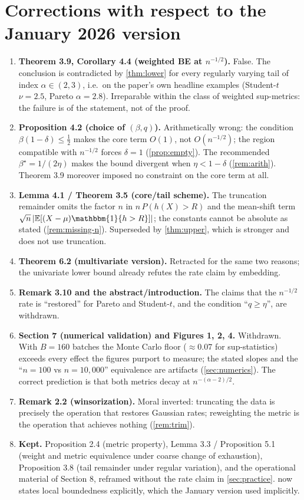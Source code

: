 \documentclass[11pt,a4paper]{article}
\theoremstyle{plain}
\theoremstyle{definition}
\theoremstyle{remark}
\numberwithin{equation}{section}
\newcommand{\E}{\mathbb{E}}
\newcommand{\1}{\mathbbm{1}}
\newcommand{\h}{h}
\begin{document}
\appendix

\section{Corrections with respect to the January 2026 version}\label{app:corrections}

\begin{enumerate}
\item \textbf{Theorem 3.9, Corollary 4.4 (weighted BE at $n^{-1/2}$).} False. The
conclusion is contradicted by \cref{thm:lower} for every regularly varying tail of
index $\alpha\in(2,3)$, i.e.\ on the paper's own headline examples (Student-$t$
$\nu=2.5$, Pareto $\alpha=2.8$). Irreparable within the class of weighted sup-metrics:
the failure is of the statement, not of the proof.
\item \textbf{Proposition 4.2 (choice of $(\beta,q)$).} Arithmetically wrong: the
condition $\beta(1-\delta)\le\frac12$ makes the core term $O(1)$, not $O(n^{-1/2})$;
the region compatible with $n^{-1/2}$ forces $\delta=1$ (\cref{prop:empty}). The
recommended $\beta^\star=1/(2\eta)$ makes the bound divergent when $\eta<1-\delta$
(\cref{rem:arith}). Theorem 3.9 moreover imposed no constraint on the core term at
all.
\item \textbf{Lemma 4.1 / Theorem 3.5 (core/tail scheme).} The truncation remainder
omits the factor $n$ in $n\,P(\h(X)>R)$ and the mean-shift term
$\sqrt n\,|\E[(X-\mu)\1\{\h>R\}]|$; the constants cannot be absolute as stated
(\cref{rem:missing-n}). Superseded by \cref{thm:upper}, which is stronger and does not
use truncation.
\item \textbf{Theorem 6.2 (multivariate version).} Retracted for the same two reasons;
the univariate lower bound already refutes the rate claim by embedding.
\item \textbf{Remark 3.10 and the abstract/introduction.} The claims that the
$n^{-1/2}$ rate is ``restored'' for Pareto and Student-$t$, and the condition
``$q\ge\eta$'', are withdrawn.
\item \textbf{Section 7 (numerical validation) and Figures 1, 2, 4.} Withdrawn. With
$B=160$ batches the Monte Carlo floor ($\approx0.07$ for sup-statistics) exceeds every
effect the figures purport to measure; the stated slopes and the ``$n=100$ vs
$n=10{,}000$'' equivalence are artifacts (\cref{sec:numerics}). The correct prediction
is that both metrics decay at $n^{-(\alpha-2)/2}$.
\item \textbf{Remark 2.2 (winsorization).} Moral inverted: truncating the data is
precisely the operation that restores Gaussian rates; reweighting the metric is the
operation that achieves nothing (\cref{rem:trim}).
\item \textbf{Kept.} Proposition 2.4 (metric property), Lemma 3.3 / Proposition 5.1
(weight and metric equivalence under coarse change of exhaustion), Proposition 3.8
(tail remainder under regular variation), and the operational material of Section 8,
reframed without the rate claim in \cref{sec:practice}.  now states local
boundedness explicitly, which the January version used implicitly.
\end{enumerate}
\end{document}
